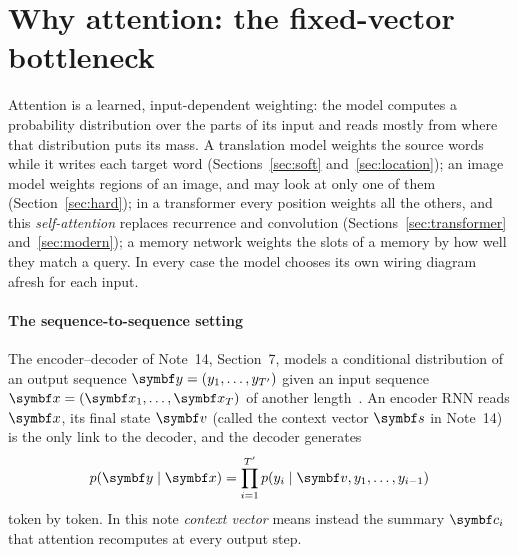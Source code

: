 \documentclass[11pt]{article}
\newcommand{\cv}{\vect{c}}
\newcommand{\vv}{\vect{v}}
\newcommand{\yv}{\vect{y}}
\begin{document}

\section{Why attention: the fixed-vector bottleneck}\label{sec:bottleneck}

Attention is a learned, input-dependent weighting: the model computes a probability distribution over the parts of its
input and reads mostly from where that distribution puts its mass. A translation model weights the source words while it
writes each target word (Sections~\ref{sec:soft} and~\ref{sec:location}); an image model weights regions of an image, and
may look at only one of them (Section~\ref{sec:hard}); in a transformer every position weights all the others, and this
\emph{self-attention} replaces recurrence and convolution (Sections~\ref{sec:transformer} and~\ref{sec:modern}); a memory
network weights the slots of a memory by how well they match a query. In every case the model chooses its own wiring
diagram afresh for each input.

\paragraph{The sequence-to-sequence setting} The encoder--decoder of Note~14, Section~7, models a conditional
distribution of an output sequence $\yv = (y_1, \dots, y_{T'})$ given an input sequence $\x = (\x_1, \dots, \x_T)$ of
another length~\cite{kalchbrenner2013,sutskever2014,cho2014}. An encoder RNN reads $\x$, its final state $\vv$ (called
the context vector $\vect{s}$ in Note~14) is the only link to the decoder, and the decoder generates
\begin{equation}\label{eq:seq2seq}
  p(\yv \mid \x) = \prod_{i=1}^{T'} p(y_i \mid \vv, y_1, \dots, y_{i-1})
\end{equation}
token by token. In this note \emph{context vector} means instead the summary $\cv_i$ that attention recomputes at every
output step.
\end{document}
